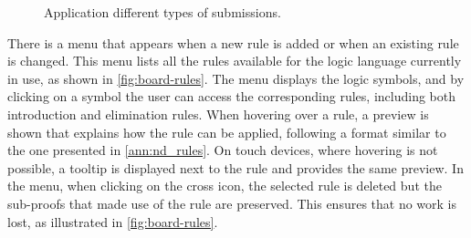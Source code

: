 \begin{figure}[h]
    \centering
    \caption{Application different types of submissions.}
    \label{fig:board-submissions}
\end{figure}

There is a menu that appears when a new rule is added or when an existing rule is changed. This menu lists all the rules available for the logic language currently in use, as shown in \autoref{fig:board-rules}. The menu displays the logic symbols, and by clicking on a symbol the user can access the corresponding rules, including both introduction and elimination rules. When hovering over a rule, a preview is shown that explains how the rule can be applied, following a format similar to the one presented in \autoref{ann:nd_rules}. On touch devices, where hovering is not possible, a tooltip is displayed next to the rule and provides the same preview. In the menu, when clicking on the cross icon, the selected rule is deleted but the sub-proofs that made use of the rule are preserved. This ensures that no work is lost, as illustrated in \autoref{fig:board-rules}.

